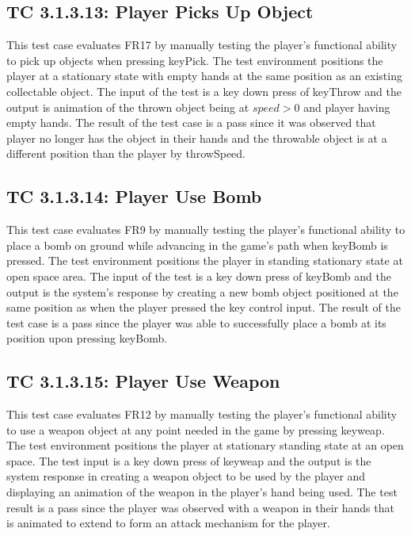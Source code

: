 \documentclass[12pt, titlepage]{article}
\begin{document}
\subsection*{TC 3.1.3.13: Player Picks Up Object}
This test case evaluates FR17 by manually testing the player's functional ability to pick up objects when pressing keyPick. The test environment positions the player at a stationary state with empty hands at the same position as an existing collectable object. The input of the test is a key down press of keyThrow and the output is animation of the thrown object being at $speed>0$ and player having empty hands. The result of the test case is a pass since it was observed that player no longer has the object in their hands and the throwable object is at a different position than the player by throwSpeed. 

\subsection*{TC 3.1.3.14: Player Use Bomb}
This test case evaluates FR9 by manually testing the player's functional ability to place a bomb on ground while advancing in the game's path when keyBomb is pressed. The test environment positions the player in standing stationary state at open space area. The input of the test is a key down press of keyBomb and the output is the system's response by creating a new bomb object positioned at the same position as when the player pressed the key control input. The result of the test case is a pass since the player was able to successfully place a bomb at its position upon pressing keyBomb.

\subsection*{TC 3.1.3.15: Player Use Weapon}
This test case evaluates FR12 by manually testing the player's functional ability to use a weapon object at any point needed in the game by pressing keyweap. The test environment positions the player at stationary standing state at an open space. The test input is a key down press of keyweap and the output is the system response in creating a weapon object to be used by the player and displaying an animation of the weapon in the player's hand being used. The test result is a pass since the player was observed with a weapon in their hands that is animated to extend to form an attack mechanism for the player. 
\end{document}
